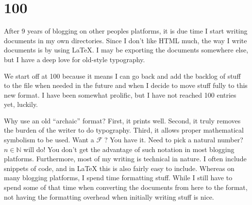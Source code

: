 \documentclass[a4paper, oneside]{memoir}
\begin{document}
\chapter*{100}

After 9 years of blogging on other peoples platforms, it is due time I start writing documents in my own directories. Since I don't like HTML much, the way I write documents is by using \LaTeX{}. I may be exporting the documents somewhere else, but I have a deep love for old-style typography.

We start off at 100 because it means I can go back and add the backlog of stuff to the file when needed in the future and when I decide to move stuff fully to this new format. I have been somewhat prolific, but I have not reached 100 entries yet, luckily.

Why use an old ``archaic'' format? First, it prints well. Second, it truly removes the burden of the writer to do typography. Third, it allows proper mathematical symbolism to be used. Want a $\mathcal{F}\; $? You have it. Need to pick a natural number? $n \in \mathbb{N}$ will do! You don't get the advantage of such notation in most blogging platforms. Furthermore, most of my writing is technical in nature. I often include snippets of code, and in \LaTeX{} this is also fairly easy to include. Whereas on many blogging platforms, I spend time formatting stuff. While I still have to spend some of that time when converting the documents from here to the format, not having the formatting overhead when initially writing stuff is nice.
\end{document}
